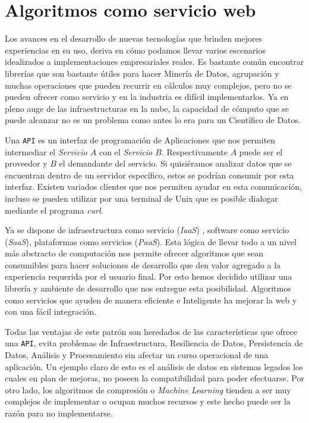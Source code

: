 \section{Algoritmos como servicio web }

	Los avances en el desarrollo de nuevas tecnologías que brinden mejores experiencias en su uso, deriva en cómo podamos llevar varios escenarios idealizados a implementaciones empresariales reales. Es bastante común encontrar librerías que son bastante útiles para hacer Minería de Datos, agrupación y muchas operaciones que pueden recurrir en cálculos muy complejos, pero no se pueden ofrecer como servicio y en la industria es difícil implementarlos. Ya en pleno auge de las infraestructuras en la nube, la capacidad de cómputo que se puede alcanzar no es un problema como antes lo era para un Científico de Datos.


	Una \texttt{API} es un interfaz de programación de Aplicaciones que nos permiten intermediar el \emph{Servicio $A$} con el \emph{Servicio $B$}. Respectivamente $A$ puede ser el proveedor y $B$ el demandante del servicio. Si quisiéramos analizar datos que se encuentran dentro de un servidor específico, estos se podrían consumir por esta interfaz. Existen variados clientes que nos permiten ayudar en esta comunicación, incluso se pueden utilizar por una terminal de {Unix} que es posible dialogar mediante el programa \emph{curl}.
	
	Ya se dispone de infraestructura como servicio (\emph{IaaS}) , software como servicio (\emph{SaaS}), plataformas como servicios (\emph{PaaS}). Esta lógica de llevar todo a un nivel más abstracto de computación nos permite ofrecer  algoritmos que sean consumibles para hacer soluciones de desarrollo que den valor agregado a la experiencia requerida por el usuario final. Por esto hemos decidido utilizar una librería y ambiente de desarrollo que nos entregue esta posibilidad. Algoritmos como servicios que ayuden de manera eficiente e Inteligente ha mejorar la web y con una fácil integración. 
	
	Todas las ventajas de este patrón son heredados de las características que ofrece una \texttt{API}, evita problemas de Infraestructura, Resiliencia de Datos, Persistencia de Datos, Análisis y Procesamiento sin afectar un curso operacional de una aplicación. Un ejemplo claro de esto es el análisis de datos en sistemas legados los cuales en plan de mejoras, no poseen la compatibilidad para poder efectuarse. Por otro lado, los algoritmos de compresión o  \emph{Machine Learning} tienden a ser muy complejos de implementar o ocupan muchos recursos y este hecho puede ser la razón para no implementarse. 
	
	
	
	